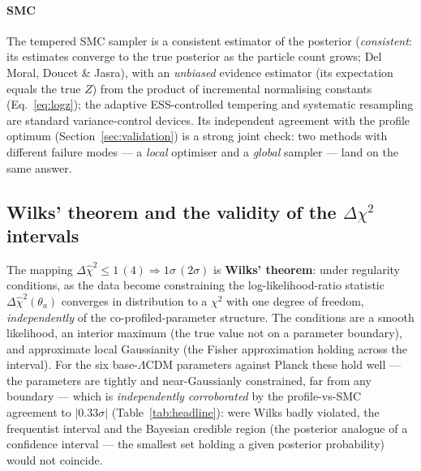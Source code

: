 \documentclass[11pt]{article}
\newcommand{\chisq}{\chi^2}
\newcommand{\dchisq}{\Delta\hat\chi^2}
\begin{document}
\paragraph{SMC}
The tempered SMC sampler is a consistent estimator of the posterior
(\emph{consistent}: its estimates converge to the true posterior as the
particle count grows; Del Moral, Doucet \& Jasra), with an \emph{unbiased}
evidence estimator (its expectation equals the true $Z$) from
the product of incremental normalising constants (Eq.~\eqref{eq:logz}); the
adaptive ESS-controlled tempering and systematic resampling are standard
variance-control devices. Its independent agreement with the profile
optimum (Section~\ref{sec:validation}) is a strong joint check: two methods
with different failure modes --- a \emph{local} optimiser and a \emph{global}
sampler --- land on the same answer.

\subsection{Wilks' theorem and the validity of the $\Delta\chisq$ intervals}
\label{sec:wilks}

The mapping $\dchisq\le1\,(4)\Rightarrow 1\sigma\,(2\sigma)$ is
\textbf{Wilks' theorem}: under regularity conditions, as the data become
constraining the log-likelihood-ratio statistic $\dchisq(\theta_a)$
converges in distribution to a $\chisq$ with one degree of freedom,
\emph{independently} of the co-profiled-parameter structure. The conditions
are a smooth likelihood, an interior maximum (the true value not on a
parameter boundary), and approximate local Gaussianity (the Fisher
approximation holding across the interval). For the six base-$\Lambda$CDM
parameters against Planck these hold well --- the parameters are tightly
and near-Gaussianly constrained, far from any boundary --- which is
\emph{independently corroborated} by the profile-vs-SMC agreement to
$|0.33\sigma|$ (Table~\ref{tab:headline}): were Wilks badly violated, the
frequentist interval and the Bayesian credible region (the posterior
analogue of a confidence interval --- the smallest set holding a given
posterior probability) would not coincide.
\end{document}
